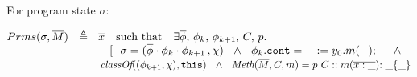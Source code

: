 \begin{definition}
For program state $\sigma$:
\label{def:params}

$\Formals \sigma \Mtwo \ \ \triangleq \ \  \overline x \ \ \ \mbox{such that} \ \  \  \exists \overline {\phi},\,\phi_k, \, \phi_{k+1}, \,C,\,p.$\\
$\strut \hspace{3.2cm} [   \ \ \sigma =  (\overline {\phi}\cdot{\phi_k}\cdot{\phi_{k+1}}\,, \chi) 
\  \ \wedge\  \ \phi_k.\prg{cont}=\_:=y_0.m(\_); \_ \  \  \wedge\ \ $\\
$\strut \hspace{3.2cm} \class{(\phi_{k+1},\chi)}  {\prg{this} }\  \ \wedge\ \ \meth{\Mtwo} {C} {m} = p \ C::m(\overline{x : \_}){:\_}\{\_\}  $
\end{definition}








